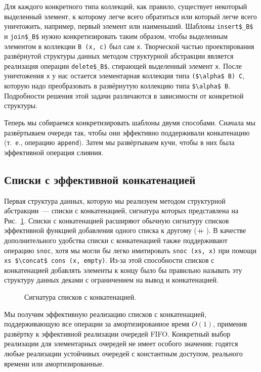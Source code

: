 Для каждого конкретного типа коллекций, как правило, существует
некоторый выделенный элемент, к которому легче всего обратиться или
который легче всего уничтожить, например, первый элемент или
наименьший.  Шаблоны \lstinline!insert$_B$! и
\lstinline!join$_B$! нужно конкретизировать таким образом, чтобы
выделенным элементом в коллекции \lstinline!B (x, c)! был сам
\lstinline!x!. Творческой частью проектирования развёрнутой структуры
данных методом структурной абстракции является реализация операции
\lstinline!delete$_B$!, стирающей выделенный элемент \lstinline!x!.
После уничтожения \lstinline!x! у нас остается элементарная коллекция
типа \lstinline!($\alpha$ B) C!, которую надо преобразовать в
развёрнутую коллекцию типа \lstinline!$\alpha$ B!. Подробности
решения этой задачи различаются в зависимости от конкретной структуры.

Теперь мы собираемся конкретизировать шаблоны двумя способами. Сначала
мы развёртываем очереди так, чтобы они эффективно поддерживали конкатенацию
(т.~е., операцию \lstinline!append!). Затем мы развёртываем кучи,
чтобы в них была эффективной операция слияния.

\subsection{Списки с эффективной конкатенацией}
\label{sc:10.2.1}

Первая структура данных, которую мы реализуем методом структурной
абстракции~--- списки с конкатенацией, сигнатура которых представлена
на Рис.~\ref{fig:10.3}. Списки с конкатенацией расширяют обычную
сигнатуру списков эффективной функцией добавления одного списка к
другому ($+\!\!\!+\,$). В качестве дополнительного удобства списки с
конкатенацией также поддерживают операцию \lstinline!snoc!, хотя мы
могли бы легко имитировать \lstinline!snoc (xs, x)! при помощи
\lstinline!xs $\concat$ cons (x, empty)!. Из-за этой
способности списков с конкатенацией добавлять элементы к концу было бы
правильно называть эту структуру данных деками с ограничением на вывод и
конкатенацией.

\begin{figure}
  \centering

  \caption{Сигнатура списков с конкатенацией.}
  \label{fig:10.3}
\end{figure}

Мы получим эффективную реализацию списков с конкатенацией,
поддерживающую все операции за амортизированное время $O(1)$, применив
развёртку к эффективной реализации очередей FIFO. Конкретный выбор
реализации для элементарных очередей не имеет особого значения;
годятся любые реализации устойчивых очередей с константным доступом,
реального времени или амортизированные.

